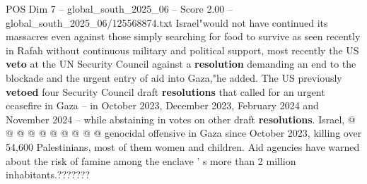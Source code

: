 \begin{textsample}{POS Dim 7 – global\_south\_2025\_06 – Score 2.00 – global\_south\_2025\_06/125568874.txt}
Israel"would not have continued its massacres even against those simply searching for food to survive as seen recently in Rafah without continuous military and political support, most recently the US \textbf{veto} at the UN Security Council against a \textbf{resolution} demanding an end to the blockade and the urgent entry of aid into Gaza,"he added.
The US previously \textbf{vetoed} four Security Council draft \textbf{resolutions} that called for an urgent ceasefire in Gaza -- in October 2023, December 2023, February 2024 and November 2024 -- while abstaining in votes on other draft \textbf{resolutions}.
Israel, @ @ @ @ @ @ @ @ @ @ genocidal offensive in Gaza since October 2023, killing over 54,600 Palestinians, most of them women and children.
Aid agencies have warned about the risk of famine among the enclave ' s more than 2 million inhabitants.???????

\end{textsample}
